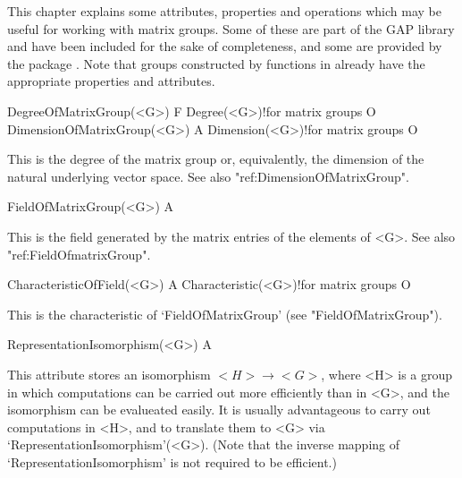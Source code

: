 
This chapter explains some attributes, properties and operations which may
be useful for working with matrix groups. Some of these are part of the 
GAP library and have been included for the sake of completeness, and some
are provided by the package {\IRREDSOL}. Note that groups constructed
by functions in {\IRREDSOL} already have the appropriate properties and
attributes. 



\>DegreeOfMatrixGroup(<G>) F
\>Degree(<G>)!{for matrix groups} O
\>DimensionOfMatrixGroup(<G>) A
\>Dimension(<G>)!{for matrix groups} O

This is the degree of the matrix group or, equivalently, the dimension of the
natural underlying vector space. See also "ref:DimensionOfMatrixGroup".

\>FieldOfMatrixGroup(<G>) A

This is the field generated by the matrix entries of the elements of <G>. See also 
"ref:FieldOfmatrixGroup".


\>CharacteristicOfField(<G>) A
\>Characteristic(<G>)!{for matrix groups} O

This is the characteristic of `FieldOfMatrixGroup' (see "FieldOfMatrixGroup").


\>RepresentationIsomorphism(<G>) A

This attribute stores an isomorphism $<H> \to <G>$, where <H> is a group
in which computations can be carried out more efficiently than in <G>, and 
the isomorphism can be evalueated easily.
It is usually advantageous to carry out computations in <H>, and to translate
them to <G> via `RepresentationIsomorphism'(<G>). (Note that the inverse 
mapping of `RepresentationIsomorphism' is not required to be efficient.)



